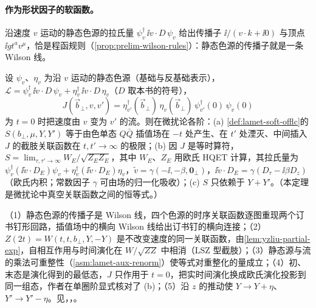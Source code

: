 \paragraph{作为形状因子的软函数。}沿速度 $v$ 运动的静态色源的拉氏量 $\psi_v^\dagger\,\ii v\cdot D\,\psi_v$ 给出传播子 $\ii/(v\cdot k+\ii0)$ 与顶点 $\ii gt^av^\mu$，恰是程函规则（\cref{prop:prelim-wilson-rules}）：静态色源的传播子就是一条 Wilson 线。

\begin{theorem}\label{thm:yzliu-soft-hqet}
设 $\psi_v$、$\eta_v$ 为沿 $v$ 运动的静态色源（基础与反基础表示），$\mathcal L=\psi_v^\dagger\,\ii v\cdot D\,\psi_v+\eta_v^\dagger\,\ii v\cdot D\,\eta_v$（$D$ 取本书的符号），
\begin{equation}\label{eq:yzliu-hqet-J}
J(\vec b_\perp,v,v')=\eta^\dagger_{v'}(\vec b_\perp)\,\eta_v(\vec b_\perp)\,\psi^\dagger_{v'}(0)\,\psi_v(0)
\end{equation}
为 $t=0$ 时把速度由 $v$ 变为 $v'$ 的流。则在微扰论各阶：(a) \cref{def:lamet-soft-offlc}的 $S(b_\perp,\mu,Y,Y')$ 等于由色单态 $Q\bar Q$ 插值场在 $-t$ 处产生、在 $t'$ 处湮灭、中间插入 $J$ 的截肢关联函数在 $t,t'\to\infty$ 的极限；(b) 因 $J$ 是等时算符，$S=\lim_{\tau,\tau'\to\infty}W_E/\sqrt{Z_EZ_E}$，其中 $W_E$、$Z_E$ 用欧氏 HQET 计算，其拉氏量为 $\psi_v^\dagger(\ii\tilde v\cdot D_E)\psi_v+\eta_v^\dagger(\ii\tilde v\cdot D_E)\eta_v$，$\tilde v=\gamma(-\ii,-\beta,\mathbf 0_\perp)$，$\ii\tilde v\cdot D_E=\gamma(D_\tau-\ii\beta D_z)$（欧氏内积；常数因子 $\gamma$ 可由场的归一化吸收）；(c) $S$ 只依赖于 $Y+Y'$。（本定理是微扰论中真空关联函数之间的恒等式。）%
\end{theorem}

\begin{proofsketch}
（1）静态色源的传播子是 Wilson 线，四个色源的时序关联函数逐图重现两个订书钉形回路，插值场中的横向 Wilson 线给出订书钉的横向连接；（2）$Z(2t)=W(t,t,b_\perp,Y,-Y)$ 是不改变速度的同一关联函数，由\cref{lem:yzliu-partial-exp}，自相互作用与时间演化在 $W/\sqrt{ZZ}$ 中相消（LSZ 型截肢）；（3）静态源与流的乘法可重整性（\cref{asm:lamet-aux-renorm}）使等式对重整化的量成立；（4）初、末态是演化得到的最低态，$J$ 只作用于 $t=0$，把实时间演化换成欧氏演化投影到同一组态，作者在单圈阶显式核对了 (b)\cite[式~(12)--(13)]{Ji:2019sxk}；（5）沿 $z$ 的推动使 $Y\to Y+\eta$、$Y'\to Y'-\eta$。见\cite[式~(1)--(13)]{Ji:2019sxk}，\cite[第~4.1--4.2~节、附录~A]{Liu:2022nnk}，\cite[第~V.C~节]{JiEtAl2021}。
\end{proofsketch}


